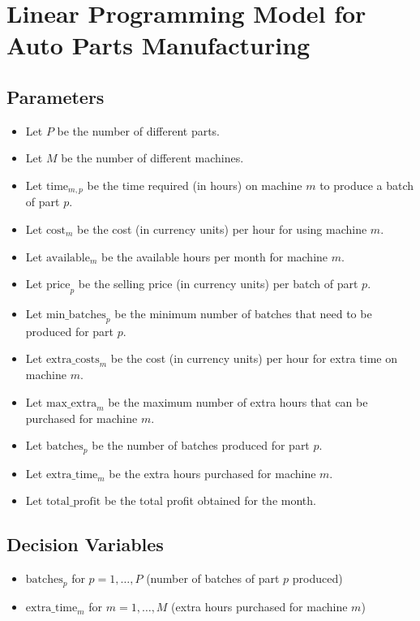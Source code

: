 \documentclass{article}
\begin{document}
\section*{Linear Programming Model for Auto Parts Manufacturing}

\subsection*{Parameters}
\begin{itemize}
    \item Let \( P \) be the number of different parts.
    \item Let \( M \) be the number of different machines.
    \item Let \( \text{time}_{m,p} \) be the time required (in hours) on machine \( m \) to produce a batch of part \( p \).
    \item Let \( \text{cost}_{m} \) be the cost (in currency units) per hour for using machine \( m \).
    \item Let \( \text{available}_{m} \) be the available hours per month for machine \( m \).
    \item Let \( \text{price}_{p} \) be the selling price (in currency units) per batch of part \( p \).
    \item Let \( \text{min\_batches}_{p} \) be the minimum number of batches that need to be produced for part \( p \).
    \item Let \( \text{extra\_costs}_{m} \) be the cost (in currency units) per hour for extra time on machine \( m \).
    \item Let \( \text{max\_extra}_{m} \) be the maximum number of extra hours that can be purchased for machine \( m \).
    \item Let \( \text{batches}_{p} \) be the number of batches produced for part \( p \).
    \item Let \( \text{extra\_time}_{m} \) be the extra hours purchased for machine \( m \).
    \item Let \( \text{total\_profit} \) be the total profit obtained for the month.
\end{itemize}

\subsection*{Decision Variables}
\begin{itemize}
    \item \( \text{batches}_{p} \) for \( p = 1, \ldots, P \) (number of batches of part \( p \) produced)
    \item \( \text{extra\_time}_{m} \) for \( m = 1, \ldots, M \) (extra hours purchased for machine \( m \))
\end{itemize}
\end{document}
